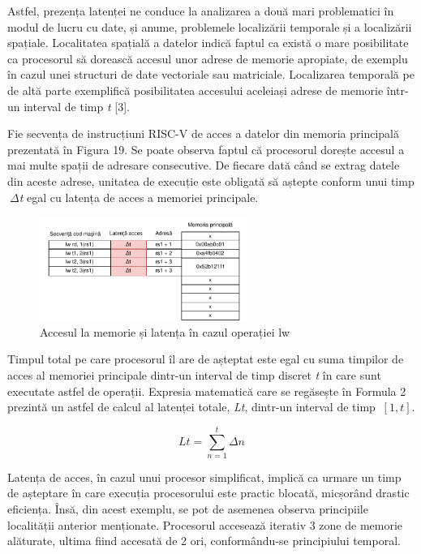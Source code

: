 \documentclass[12pt]{article}
\begin{document}
Astfel, prezența latenței ne conduce la analizarea a două mari problematici în modul de lucru cu date, și anume, problemele localizării temporale și a localizării spațiale. Localitatea spațială a datelor indică faptul ca există o mare posibilitate ca procesorul să dorească accesul unor adrese de memorie apropiate, de exemplu în cazul unei structuri de date vectoriale sau matriciale. Localizarea temporală pe de altă parte exemplifică posibilitatea accesului aceleiași adrese de memorie într-un interval de timp \textit{t} [3].

Fie secvența de instrucțiuni RISC-V de acces a datelor din memoria principală prezentată în Figura 19. Se poate observa faptul că procesorul dorește accesul a mai multe spații de adresare consecutive. De fiecare dată când se extrag datele din aceste adrese, unitatea de execuție este obligată să aștepte conform unui timp \textit{$\ {\Delta}$t} egal cu latența de acces a memoriei principale.

 \begin{figure}[h!]
 \includegraphics[width=0.6\textwidth]{cachememoryacces.pdf}
 \centering
 \caption{Accesul la memorie și latența în cazul operației lw}
 \label{Figura:40}
 \end{figure}
 
Timpul total pe care procesorul îl are de așteptat este egal cu suma timpilor de acces al memoriei principale dintr-un interval de timp discret \textit{t} în care sunt executate astfel de operații. Expresia matematică care se regăsește în Formula 2 prezintă un astfel de calcul al latenței totale, \textit{Lt}, dintr-un interval de timp $\ [1, t] $.
 
 \begin{equation}
\label{Formula:1}
Lt = \sum_{n=1}^{t} \Delta n
\end{equation}

Latența de acces, în cazul unui procesor simplificat, implică ca urmare un timp de așteptare în care execuția procesorului este practic blocată, micșorând drastic eficiența. Însă, din acest exemplu, se pot de asemenea observa principiile localității anterior menționate. Procesorul accesează iterativ 3 zone de memorie alăturate, ultima fiind accesată de 2 ori, conformându-se principiului temporal.
\end{document}
